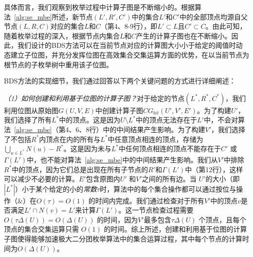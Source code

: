 具体而言，我们观察到枚举过程中计算子图是不断缩小的。根据算法~\ref{alg:se_mbe}所述，新节点$(L',R',C')$中的集合$L'$和$C'$中的全部顶点均源自父节点$(L, R, C)$对应的集合$L$和$C$（第4、8-9行），即$L'\subset L$且$C'\subset C$。由此可知，随着枚举过程的深入，根据节点内集合$L$和$C$产生的计算子图也在不断缩小。因此，我们设计的BDS方法可以在当前节点对应的计算图大小小于给定的阈值时动态建立子位图，并充分发挥位图在高效集合交集运算方面的优势，在以当前节点为根节点的子枚举树中重用该子位图。





BDS方法的实现细节，我们通过回答以下两个关键问题的方式进行详细阐述：

\textit{（1）如何创建和利用基于位图的计算子图？}对于给定的节点$(L^*, R^*, C^*)$，我们利用位图从原始图$G(U, V, E)$中创建计算子图$CG_{bit}(U',V',E')$。为了构建$U'$，我们选择了所有$L^*$中的顶点。这是因为$U \setminus L^*$中的顶点无法存在于$L'$中，不会对算法~\ref{alg:se_mbe}（第4、6、8行）中的中间结果产生影响。为了构建$V'$，我们选择了不包括$R^*$内顶点在内的所有与$L^*$中任意顶点相连的顶点，存储为$\bigcup_{u \in L^*}N(u) - R^*$。这是因为未与$L^*$中任何顶点相连的顶点不能存在于$C'$ 或 $\Gamma(L')$中，也不能对算法~\ref{alg:se_mbe}中的中间结果产生影响。我们从$V'$中排除$R^*$中的顶点，因为它们总是出现在所有子节点的$R'$和$\Gamma(L')$中（第12行），这样可以减少不必要的计算。$E'$包含原图内$U'$ 和$V'$之间的所有边。当 $U'$的大小（即$|L^*|$）小于某个给定的小的\emph{常数$\tau$}时，算法中的每个集合操作都可以通过按位与操作（\&）在$O(\tau) = O(1)$ 的时间内完成。我们通过检查对于所有$V'$中的顶点$v$是否满足$L' \cap N(v) = L'$来计算$\Gamma(L')$。这一节点检查过程需要$O(\tau \Delta(U))=O(\Delta(U))$ 的时间，因为$V'$最多包含$\tau \Delta(U)$ 个顶点，且每个顶点的集合交集运算只需 $O(1)$ 的时间。综上所述，创建和利用基于位图的计算子图使得能够加速极大二分团枚举算法中的集合运算过程，其中每个节点的计算时间为$O(\Delta(U))$。

